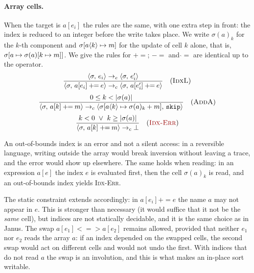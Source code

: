 \paragraph{Array cells.} When the target is $a[e_i]$ the rules are the
same, with one extra step in front: the index is reduced to an integer before
the write takes place. We write $\sigma(a)_k$ for the $k$-th component and
$\updc{\sigma}{a}{k}{m}$ for the update of cell $k$ alone, that is,
$\upd{\sigma}{a}{\sigma(a)[k \mapsto m]}$. We give the rules for
$\mathbin{+\!\!=}$; $\mathbin{-\!\!=}$ and $\mathbin{\hat{}\!=}$ are identical
up to the operator.
\[
\dfrac{\cfg{e_i}{\sigma} \toe \cfg{e_i'}{\sigma}}
      {\cfg{a[e_i] \mathbin{+\!\!=} e}{\sigma} \toc \cfg{a[e_i'] \mathbin{+\!\!=} e}{\sigma}} \rname{IdxL}
\]
\[
\dfrac{0 \leq k < |\sigma(a)|}
      {\cfg{a[k] \mathbin{+\!\!=} m}{\sigma} \toc \cfg{\mathtt{skip}}{\updc{\sigma}{a}{k}{\sigma(a)_k + m}}} \rname{AddA}
\]
\[
\dfrac{k < 0 \ \lor\ k \geq |\sigma(a)|}
      {\cfg{a[k] \mathbin{+\!\!=} m}{\sigma} \toc \err} \rnameerr{Idx-Err}
\]

\noindent
An out-of-bounds index is an error and not a silent access: in a
reversible language, writing outside the array would break inversion without
leaving a trace, and the error would show up elsewhere. The same holds when reading:
in an expression $a[e]$ the index $e$ is evaluated first, then the cell
$\sigma(a)_k$ is read, and an out-of-bounds index yields \textsc{Idx-Err}.

\noindent
The static constraint extends accordingly: in $a[e_i] \mathbin{+\!\!=} e$ the
name $a$ may not appear in $e$. This is stronger than necessary (it would suffice that it
not be the \emph{same} cell), but indices are not statically
decidable, and it is the same choice as in Janus. The swap $a[e_1]
\mathbin{<\!=\!>} a[e_2]$ remains allowed, provided that neither $e_1$ nor $e_2$
reads the array $a$: if an index depended on the swapped cells, the second
swap would act on different cells and would not undo the first. With indices that do not
read $a$ the swap is an involution, and this is what makes an
in-place sort writable.

